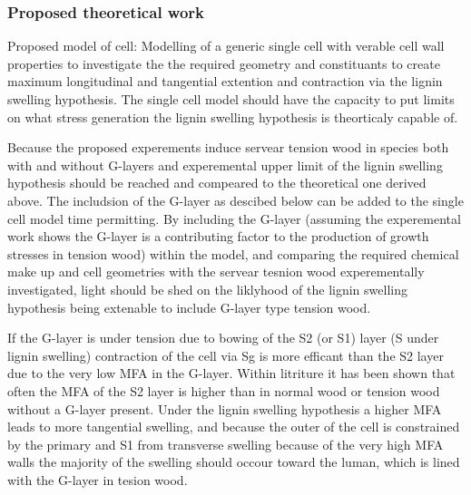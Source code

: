 \documentclass{article}
\begin{document}
\subsubsection{Proposed theoretical work}
%
%
%
%
%
%
%
%
%
%
%


Proposed model of cell:
Modelling of a generic single cell with verable cell wall properties to
investigate the the required geometry and constituants to create maximum
longitudinal and tangential extention and contraction via the lignin swelling
hypothesis. The single cell model should have the capacity to put limits on what
stress generation the lignin swelling hypothesis is theorticaly capable of.

Because the proposed experements induce servear tension wood in species both
with and without G-layers and experemental upper limit of the lignin swelling
hypothesis should be reached and compeared to the theoretical one derived above.
The includsion of the G-layer as descibed below can be added to the single cell
model time permitting. By including the G-layer (assuming the experemental work
shows the G-layer is a contributing factor to the production of growth stresses
in tension wood) within the model, and comparing the required chemical make up
and cell geometries with the servear tesnion wood experementally
investigated, light should be shed on the liklyhood of the lignin swelling
hypothesis being extenable to include G-layer type tension wood.

If the G-layer is under tension due to bowing of the S2 (or S1) layer (S under
lignin swelling) contraction of the cell via Sg is more efficant than the S2
layer due to the very low MFA in the G-layer. Within litriture it has been shown
that often the MFA of the S2 layer is higher than in normal wood or tension wood
without a G-layer present. Under the lignin swelling hypothesis a higher MFA
leads to more tangential swelling, and because the outer of the cell is
constrained by the primary and S1 from transverse swelling because of the
very high MFA walls the majority of the swelling should occour toward the luman,
which is lined with the G-layer in tesion wood.
\end{document}
